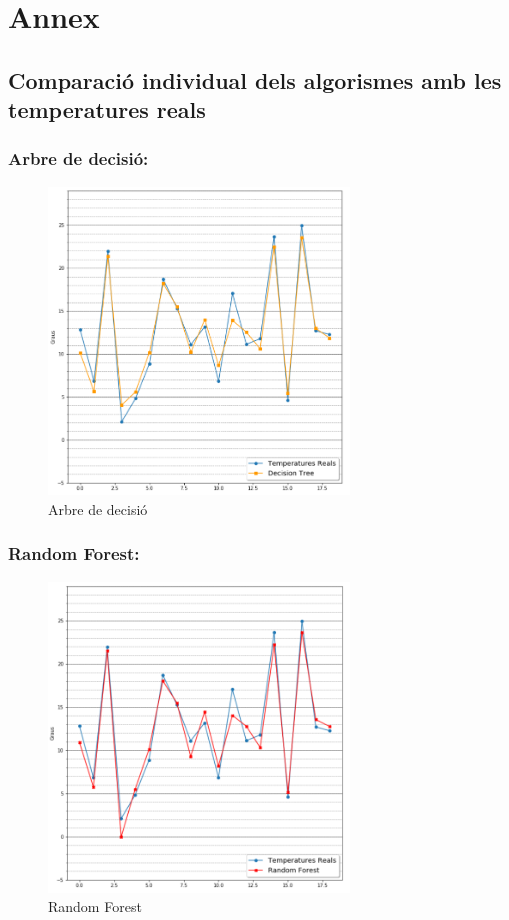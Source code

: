 \documentclass[10pt,a4paper,twocolumn,twoside]{article}
\begin{document}
\section{Annex}

\subsection{Comparació individual dels algorismes amb les temperatures reals}
\subsubsection{Arbre de decisió:}
\begin{figure}[!h]
\centering
	\includegraphics[width=80mm]{../img/decisionTreePredict}
	\caption{Arbre de decisió}
	\label{fig-DT}
\end{figure}
\subsubsection{Random Forest:}
\begin{figure}[!h]
\centering
	\includegraphics[width=80mm]{../img/randomForestPredict}
	\caption{Random Forest}
	\label{fig-RF}
\end{figure}
\newpage
\end{document}
